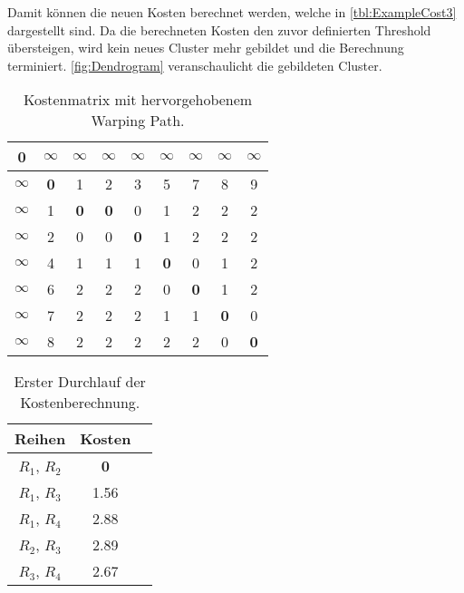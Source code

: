 Damit können die neuen Kosten berechnet werden,
welche in \autoref{tbl:ExampleCost3} dargestellt sind.
Da die berechneten Kosten den zuvor definierten Threshold übersteigen,
wird kein neues Cluster mehr gebildet und die Berechnung terminiert.
\autoref{fig:Dendrogram} veranschaulicht die gebildeten Cluster.
\begin{table}[ht]
    \begin{center}
        \begin{tabular}{ |c||c|c|c|c|c|c|c|c| } 
         \hline
         \textbf{0} & $\infty$ & $\infty$ & $\infty$
         & $\infty$ & $\infty$ & $\infty$ & $\infty$ & $\infty$ \\
         \hline
         \hline
         $\infty$ &\textbf{0} & 1 & 2 & 3 & 5 & 7 & 8 & 9 \\
         \hline
         $\infty$ & 1 & \textbf{0} & \textbf{0} & 0 & 1 & 2 & 2 & 2 \\
         \hline
         $\infty$ & 2 & 0 & 0 & \textbf{0} & 1 & 2 & 2 & 2 \\
         \hline
         $\infty$ & 4 & 1 & 1 & 1 & \textbf{0} & 0 & 1 & 2 \\
         \hline
         $\infty$ & 6 & 2 & 2 & 2 & 0 & \textbf{0} & 1 & 2 \\
         \hline
         $\infty$ & 7 & 2 & 2 & 2 & 1 & 1 & \textbf{0} & 0 \\
         \hline
         $\infty$ & 8 & 2 & 2 & 2 & 2 & 2 & 0 & \textbf{0} \\
         \hline
        \end{tabular}
        \caption{Kostenmatrix mit hervorgehobenem Warping Path.}
        \label{tbl:ExampleMatrix}
    \end{center}
\end{table}
\begin{table}[ht]
    \begin{center}
        \begin{tabular}{ |c|c|c| } 
         \hline
         Reihen & Kosten \\
         \hline \hline
         $R_{1}$, $R_{2}$ & \textbf{0} \\
         \hline
         $R_{1}$, $R_{3}$ & 1.56 \\
         \hline
         $R_{1}$, $R_{4}$ & 2.88 \\
         \hline
         $R_{2}$, $R_{3}$ & 2.89 \\
         \hline
         $R_{3}$, $R_{4}$ & 2.67 \\
         \hline
        \end{tabular}
        \caption{Erster Durchlauf der Kostenberechnung.}
        \label{tbl:ExampleCost1}
    \end{center}
\end{table}
